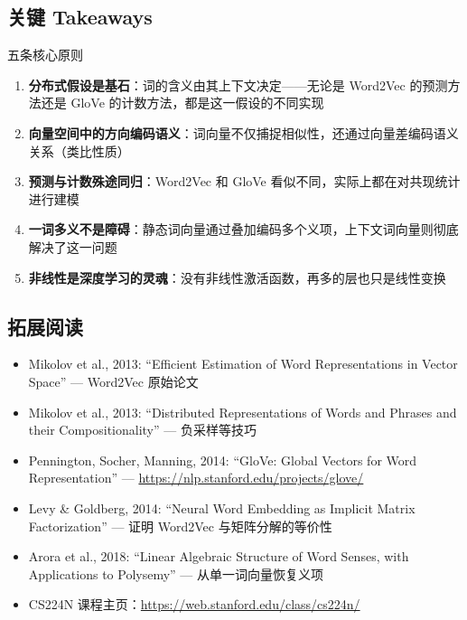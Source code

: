 \subsection{关键 Takeaways}

\begin{importantbox}{五条核心原则}
\begin{enumerate}
    \item \textbf{分布式假设是基石}：词的含义由其上下文决定——无论是 Word2Vec 的预测方法还是 GloVe 的计数方法，都是这一假设的不同实现
    \item \textbf{向量空间中的方向编码语义}：词向量不仅捕捉相似性，还通过向量差编码语义关系（类比性质）
    \item \textbf{预测与计数殊途同归}：Word2Vec 和 GloVe 看似不同，实际上都在对共现统计进行建模
    \item \textbf{一词多义不是障碍}：静态词向量通过叠加编码多个义项，上下文词向量则彻底解决了这一问题
    \item \textbf{非线性是深度学习的灵魂}：没有非线性激活函数，再多的层也只是线性变换
\end{enumerate}
\end{importantbox}

\subsection{拓展阅读}

\begin{itemize}
    \item Mikolov et al., 2013: ``Efficient Estimation of Word Representations in Vector Space'' — Word2Vec 原始论文
    \item Mikolov et al., 2013: ``Distributed Representations of Words and Phrases and their Compositionality'' — 负采样等技巧
    \item Pennington, Socher, Manning, 2014: ``GloVe: Global Vectors for Word Representation'' — \url{https://nlp.stanford.edu/projects/glove/}
    \item Levy \& Goldberg, 2014: ``Neural Word Embedding as Implicit Matrix Factorization'' — 证明 Word2Vec 与矩阵分解的等价性
    \item Arora et al., 2018: ``Linear Algebraic Structure of Word Senses, with Applications to Polysemy'' — 从单一词向量恢复义项
    \item CS224N 课程主页：\url{https://web.stanford.edu/class/cs224n/}
\end{itemize}


